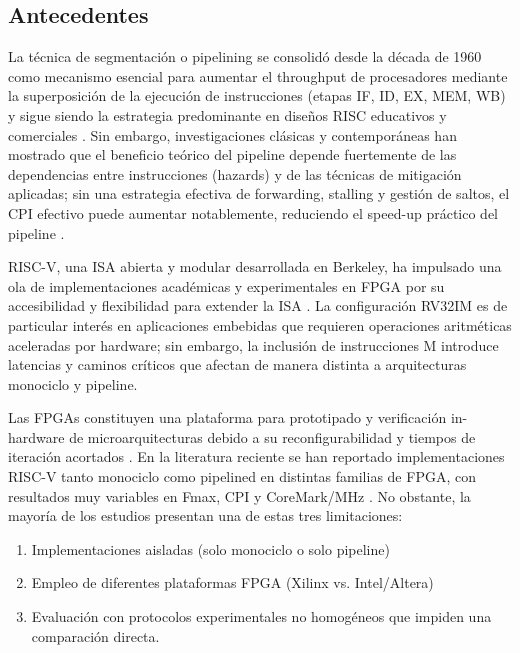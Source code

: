 \subsection{Antecedentes}
\label{sec:Antecedentes}

La técnica de segmentación o pipelining se consolidó desde la década de 1960 como mecanismo esencial para aumentar el throughput de procesadores mediante la superposición de la ejecución de instrucciones (etapas IF, ID, EX, MEM, WB) y sigue siendo la estrategia predominante en diseños RISC educativos y comerciales \parencite{Patterson2017Computer}. Sin embargo, investigaciones clásicas y contemporáneas han mostrado que el beneficio teórico del pipeline depende fuertemente de las dependencias entre instrucciones (hazards) y de las técnicas de mitigación aplicadas; sin una estrategia efectiva de forwarding, stalling y gestión de saltos, el CPI efectivo puede aumentar notablemente, reduciendo el speed-up práctico del pipeline \parencite{Smith1988Implementing,Wall1991Limits}.

RISC-V, una ISA abierta y modular desarrollada en Berkeley,  ha impulsado una ola de implementaciones académicas y experimentales en FPGA por su accesibilidad y flexibilidad para extender la ISA \parencite{RISCV2019Manual}. La configuración RV32IM es de particular interés en aplicaciones embebidas que requieren operaciones aritméticas aceleradas por hardware; sin embargo, la inclusión de instrucciones M introduce latencias y caminos críticos que afectan de manera distinta a arquitecturas monociclo y pipeline.

Las FPGAs constituyen una plataforma para prototipado y verificación in-hardware de microarquitecturas debido a su reconfigurabilidad y tiempos de iteración acortados \parencite{Chu2011FPGA}. En la literatura reciente se han reportado implementaciones RISC-V tanto monociclo como pipelined en distintas familias de FPGA, con resultados muy variables en Fmax, CPI y CoreMark/MHz \parencite{Heinz2019Catalog,NRP2024Performance}. No obstante, la mayoría de los estudios presentan una de estas tres limitaciones: 
\begin{enumerate}
    \item Implementaciones aisladas (solo monociclo o solo pipeline) 
    \item Empleo de diferentes plataformas FPGA (Xilinx vs. Intel/Altera)
    \item Evaluación con protocolos experimentales no homogéneos que impiden una comparación directa.
\end{enumerate}

